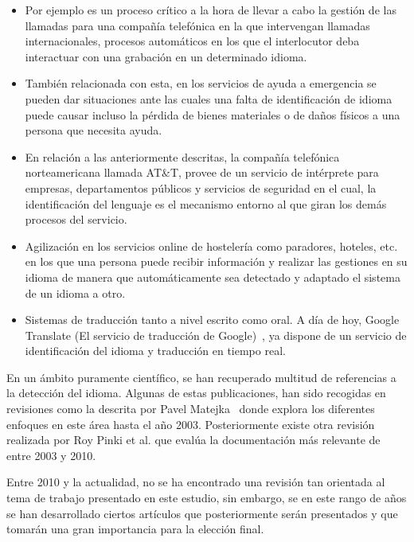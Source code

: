 \documentclass[runningheads,a4paper]{llncs}
\theoremstyle{break}
\begin{document}
\begin{itemize}

  \item Por ejemplo es un proceso crítico a la hora de llevar a cabo la gestión de las llamadas para una compañía telefónica en la que intervengan llamadas internacionales, procesos automáticos en los que el interlocutor deba interactuar con una grabación en un determinado idioma.

  \item También relacionada con esta, en los servicios de ayuda a emergencia se pueden dar situaciones ante las cuales una falta de identificación de idioma puede causar incluso la pérdida de bienes materiales o de daños físicos a una persona que necesita ayuda.

  \item En relación a las anteriormente descritas, la compañía telefónica norteamericana llamada AT\&T, provee de un servicio de intérprete para empresas, departamentos públicos y servicios de seguridad en el cual, la identificación del lenguaje es el mecanismo entorno al que giran los demás procesos del servicio.

  \item Agilización en los servicios online de hostelería como paradores, hoteles, etc. en los que una persona puede recibir información y realizar las gestiones en su idioma de manera que automáticamente sea detectado y adaptado el sistema de un idioma a otro.

  \item Sistemas de traducción tanto a nivel escrito como oral. A día de hoy, Google Translate (El servicio de traducción de Google)~\cite{lid:3}, ya dispone de un servicio de identificación del idioma y traducción en tiempo real.
\end{itemize}

En un ámbito puramente científico, se han recuperado multitud de referencias a la detección del idioma. Algunas de estas publicaciones, han sido recogidas en revisiones como la descrita por Pavel Matejka~\cite{lid:4} donde explora los diferentes enfoques en este área hasta el año 2003. Posteriormente existe otra revisión realizada por Roy Pinki et al. \cite{lid:5} que evalúa la documentación más relevante de entre 2003 y 2010. 

Entre 2010 y la actualidad, no se ha encontrado una revisión tan orientada al tema de trabajo presentado en este estudio, sin embargo, se en este rango de años se han desarrollado ciertos artículos que posteriormente serán presentados y que tomarán una gran importancia para la elección final.
\end{document}
